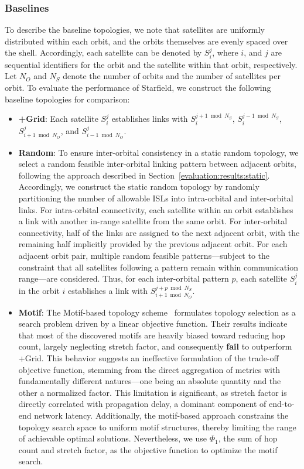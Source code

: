 \documentclass[acmsmall, screen]{acmart}
\begin{document}
\subsubsection{Baselines}\label{evaluation:setup:baselines}
To describe the baseline topologies, we note that satellites are uniformly distributed within each orbit, and the orbits themselves are evenly spaced over the shell. Accordingly, each satellite can be denoted by $S_i^j$, where $i$, and $j$ are sequential identifiers for the orbit and the satellite within that orbit, respectively. Let $N_O$ and $N_S$ denote the number of orbits and the number of satellites per orbit. To evaluate the performance of Starfield, we construct the following baseline topologies for comparison:
\begin{itemize}
  \item \textbf{+Grid}: Each satellite $S_i^j$ establishes links with $S_i^{j+1 \bmod N_S}$, $S_i^{j-1 \bmod N_S}$, $S_{i+1 \bmod N_O}^j$, and $S_{i-1 \bmod N_O}^j$.
  \item \textbf{Random}: To ensure inter-orbital consistency in a static random topology, we select a random feasible inter-orbital linking pattern between adjacent orbits, following the approach described in Section~\ref{evaluation:results:static}. Accordingly, we construct the static random topology by randomly partitioning the number of allowable ISLs into intra-orbital and inter-orbital links. For intra-orbital connectivity, each satellite within an orbit establishes a link with another in-range satellite from the same orbit. For inter-orbital connectivity, half of the links are assigned to the next adjacent orbit, with the remaining half implicitly provided by the previous adjacent orbit. For each adjacent orbit pair, multiple random feasible patterns—subject to the constraint that all satellites following a pattern remain within communication range—are considered. Thus, for each inter-orbital pattern $p$, each satellite $S_i^j$ in the orbit $i$ establishes a link with $S_{i+1 \bmod N_O}^{j+p \bmod N_S}$.
  \item \textbf{Motif}: The Motif-based topology scheme~\cite{bhattacherjee2019network} formulates topology selection as a search problem driven by a linear objective function. Their results indicate that most of the discovered motifs are heavily biased toward reducing hop count, largely neglecting stretch factor, and consequently \textbf{fail} to outperform +Grid. This behavior suggests an ineffective formulation of the trade-off objective function, stemming from the direct aggregation of metrics with fundamentally different natures—one being an absolute quantity and the other a normalized factor. This limitation is significant, as stretch factor is directly correlated with propagation delay, a dominant component of end-to-end network latency. Additionally, the motif-based approach constrains the topology search space to uniform motif structures, thereby limiting the range of achievable optimal solutions. Nevertheless, we use $\Phi_1$, the sum of hop count and stretch factor, as the objective function to optimize the motif search. 
\end{itemize}
\end{document}
